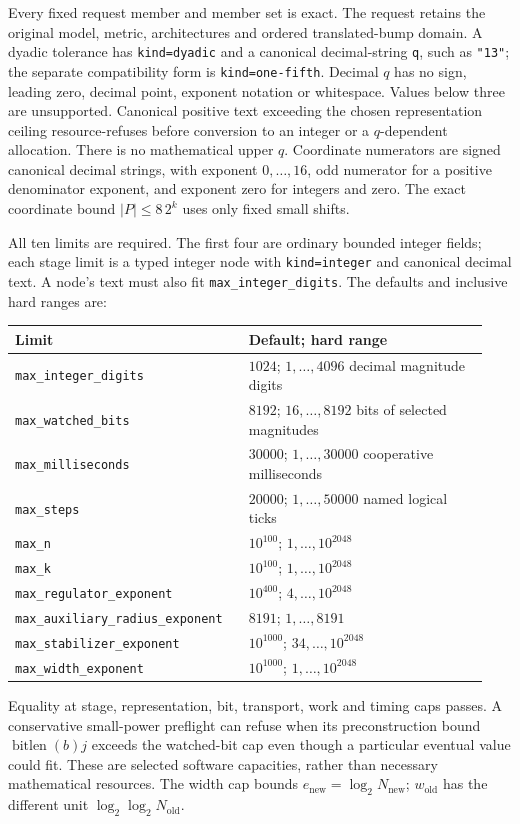Every fixed request member and member set is exact. The request retains
the original model, metric, architectures and ordered translated-bump domain.
A dyadic tolerance has \texttt{kind=dyadic} and a canonical decimal-string
\texttt{q}, such as \texttt{"13"}; the separate compatibility form is
\texttt{kind=one-fifth}. Decimal $q$ has no sign, leading zero, decimal point,
exponent notation or whitespace. Values below three are unsupported.
Canonical positive text exceeding the chosen representation ceiling
resource-refuses before conversion to an integer or a $q$-dependent
allocation. There is no mathematical upper $q$. Coordinate numerators are
signed canonical decimal strings, with exponent $0,\ldots,16$, odd numerator
for a positive denominator exponent, and exponent zero for integers and zero.
The exact coordinate bound $|P|\le8\,2^k$ uses only fixed small shifts.

All ten limits are required. The first four are ordinary bounded integer
fields; each stage limit is a typed integer node with
\texttt{kind=integer} and canonical decimal text. A node's text must also fit
\texttt{max\_integer\_digits}. The defaults and inclusive hard ranges are:
\begingroup
\small
\setlength{\parskip}{0pt}
\begin{longtable}{@{}p{0.46\linewidth}p{0.48\linewidth}@{}}
\toprule
Limit & Default; hard range \\
\midrule
\endhead
\texttt{max\_integer\_digits} & $1024$; $1,\ldots,4096$ decimal magnitude digits \\
\texttt{max\_watched\_bits} & $8192$; $16,\ldots,8192$ bits of selected magnitudes \\
\texttt{max\_milliseconds} & $30000$; $1,\ldots,30000$ cooperative milliseconds \\
\texttt{max\_steps} & $20000$; $1,\ldots,50000$ named logical ticks \\
\texttt{max\_n} & $10^{100}$; $1,\ldots,10^{2048}$ \\
\texttt{max\_k} & $10^{100}$; $1,\ldots,10^{2048}$ \\
\texttt{max\_regulator\_exponent} & $10^{400}$; $4,\ldots,10^{2048}$ \\
\texttt{max\_auxiliary\_radius\_exponent} & $8191$; $1,\ldots,8191$ \\
\texttt{max\_stabilizer\_exponent} & $10^{1000}$; $34,\ldots,10^{2048}$ \\
\texttt{max\_width\_exponent} & $10^{1000}$; $1,\ldots,10^{2048}$ \\
\bottomrule
\end{longtable}
\endgroup
Equality at stage, representation, bit, transport, work and timing caps
passes. A conservative small-power preflight can refuse when its
preconstruction bound $\operatorname{bitlen}(b)j$ exceeds the watched-bit
cap even though a particular eventual value could fit. These are selected
software capacities, rather than necessary mathematical resources.
The width cap bounds $e_{\mathrm{new}}=\log_2N_{\mathrm{new}}$;
$w_{\mathrm{old}}$ has the different unit $\log_2\log_2N_{\mathrm{old}}$.

